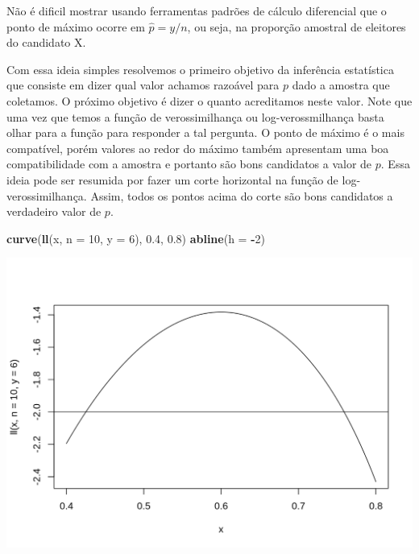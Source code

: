 \documentclass[10pt,a4paper]{book}
\newenvironment{Shaded}{\begin{snugshade}}{\end{snugshade}}
\newcommand{\KeywordTok}[1]{\textcolor[rgb]{0.13,0.29,0.53}{\textbf{#1}}}
\newcommand{\DataTypeTok}[1]{\textcolor[rgb]{0.13,0.29,0.53}{#1}}
\newcommand{\DecValTok}[1]{\textcolor[rgb]{0.00,0.00,0.81}{#1}}
\newcommand{\FloatTok}[1]{\textcolor[rgb]{0.00,0.00,0.81}{#1}}
\newcommand{\OperatorTok}[1]{\textcolor[rgb]{0.81,0.36,0.00}{\textbf{#1}}}
\newcommand{\NormalTok}[1]{#1}
\begin{document}
Não é dificil mostrar usando ferramentas padrões de cálculo diferencial
que o ponto de máximo ocorre em \(\hat{p} = y/n\), ou seja, na proporção
amostral de eleitores do candidato X.

Com essa ideia simples resolvemos o primeiro objetivo da inferência
estatística que consiste em dizer qual valor achamos razoável para \(p\)
dado a amostra que coletamos. O próximo objetivo é dizer o quanto
acreditamos neste valor. Note que uma vez que temos a função de
verossimilhança ou log-verossmilhança basta olhar para a função para
responder a tal pergunta. O ponto de máximo é o mais compatível, porém
valores ao redor do máximo também apresentam uma boa compatibilidade com
a amostra e portanto são bons candidatos a valor de \(p\). Essa ideia
pode ser resumida por fazer um corte horizontal na função de
log-verossimilhança. Assim, todos os pontos acima do corte são bons
candidatos a verdadeiro valor de \(p\).

\begin{Shaded}
\begin{Highlighting}[]
\KeywordTok{curve}\NormalTok{(}\KeywordTok{ll}\NormalTok{(x, }\DataTypeTok{n =} \DecValTok{10}\NormalTok{, }\DataTypeTok{y =} \DecValTok{6}\NormalTok{), }\FloatTok{0.4}\NormalTok{, }\FloatTok{0.8}\NormalTok{)}
\KeywordTok{abline}\NormalTok{(}\DataTypeTok{h =} \OperatorTok{-}\DecValTok{2}\NormalTok{)}
\end{Highlighting}
\end{Shaded}

\begin{center}\includegraphics{figures/unnamed-chunk-376-1} \end{center}
\end{document}
